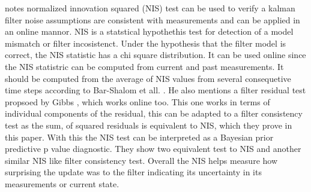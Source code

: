 \cite{piche2016online} notes
normalized innovation squared (NIS) test can be used to verify a kalman filter noise assumptions are consistent with measurements and can be applied in an online mannor. NIS is a statstical hypothethis test for detection of a model mismatch or filter incosistenct. Under the hypothesis that the filter model is correct, the NIS statistic has a chi square distribution. It can be used online since the NIS statistric can be computed from current and past measurements. It should be computed from the average of NIS values from several consequetive time steps according to Bar-Shalom et all. \cite{bar2001estimation}. He also mentions a filter residual test propsoed by Gibbs \cite{gibbs2013new}, which works online too. This one works in terms of individual components of the residual, this can be adapted to a filter consistency test as the sum, of squared residuals is equivalent to NIS, which they prove in this paper. With this the NIS test can be interpreted as a Bayesian prior predictive p value diagnostic. They show two equivalent test to NIS and another similar NIS like filter consistency test. Overall the NIS helps measure how surprising the update was to the filter indicating its uncertainty in its measurements or current state.


